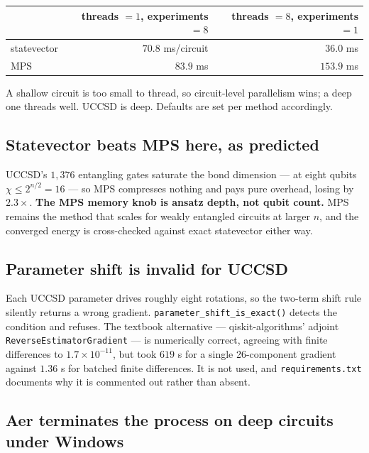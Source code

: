 \documentclass[11pt,a4paper]{article}
\newcommand{\code}[1]{\texttt{\small #1}}
\begin{document}
\begin{center}
\small
\begin{tabular}{lrr}
\toprule
& threads $=1$, experiments $=8$ & threads $=8$, experiments $=1$ \\
\midrule
statevector & $70.8$ ms/circuit & $\mathbf{36.0}$ ms \\
MPS         & $\mathbf{83.9}$ ms & $153.9$ ms \\
\bottomrule
\end{tabular}
\end{center}

A shallow circuit is too small to thread, so circuit-level parallelism wins; a
deep one threads well. UCCSD is deep. Defaults are set per method accordingly.

\subsection{Statevector beats MPS here, as predicted}

UCCSD's $1{,}376$ entangling gates saturate the bond dimension --- at eight
qubits $\chi \leq 2^{n/2} = 16$ --- so MPS compresses nothing and pays pure
overhead, losing by $2.3\times$. \textbf{The MPS memory knob is ansatz depth,
not qubit count.} MPS remains the method that scales for weakly entangled
circuits at larger $n$, and the converged energy is cross-checked against exact
statevector either way.

\subsection{Parameter shift is invalid for UCCSD}

Each UCCSD parameter drives roughly eight rotations, so the two-term shift rule
silently returns a wrong gradient. \code{parameter\_shift\_is\_exact()} detects
the condition and refuses. The textbook alternative --- qiskit-algorithms'
adjoint \code{ReverseEstimatorGradient} --- is numerically correct, agreeing with
finite differences to $1.7\times10^{-11}$, but took $619$ s for a single
26-component gradient against $1.36$ s for batched finite differences. It is not
used, and \code{requirements.txt} documents why it is commented out rather than
absent.

\subsection{Aer terminates the process on deep circuits under Windows}
\end{document}
